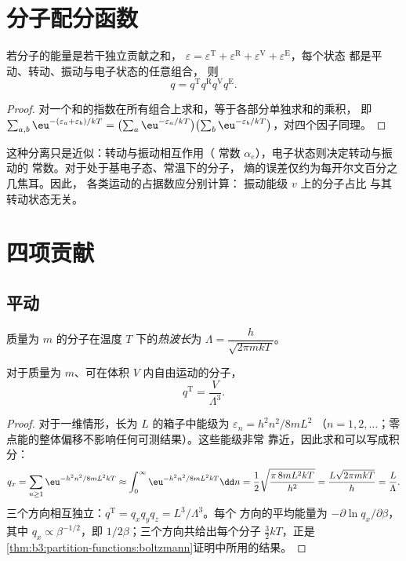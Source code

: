 \section{分子配分函数}

\begin{proposition}[因子分解]\label{prop:b3:partition-functions:factorisation}
若分子的能量是若干独立贡献之和，
$\varepsilon = \varepsilon^{\mathrm T} + \varepsilon^{\mathrm R} + \varepsilon^{\mathrm V} + \varepsilon^{\mathrm E}$，每个状态
都是平动、转动、振动与电子状态的任意组合，
则
\[
  q = q^{\mathrm T}q^{\mathrm R}q^{\mathrm V}q^{\mathrm E}.
\]
\end{proposition}

\begin{proof}
对一个和的指数在所有组合上求和，等于各部分单独求和的乘积，
即 $\sum_{a,b}\eu^{-(\varepsilon_a+\varepsilon_b)/kT} = \bigl(\sum_a\eu^{-\varepsilon_a/kT}\bigr)
\bigl(\sum_b\eu^{-\varepsilon_b/kT}\bigr)$，对四个因子同理。
\end{proof}

这种分离只是近似：转动与振动相互作用（
常数 $\alpha_e$），电子状态则决定转动与振动的
常数。对于处于基电子态、常温下的分子，
熵的误差仅约为每开尔文百分之几焦耳。因此，
各类运动的占据数应分别计算：
振动能级 $v$ 上的分子占比
与其转动状态无关。

\section{四项贡献}

\subsection*{平动}

\begin{definition}[热波长]\label{def:b3:partition-functions:thermal-wavelength}
质量为 $m$ 的分子在温度 $T$ 下的\emph{热波长}为
$\Lambda = \dfrac{h}{\sqrt{2\pi mkT}}$。
\end{definition}

\begin{proposition}[平动配分函数]\label{prop:b3:partition-functions:q-trans}
对于质量为 $m$、可在体积 $V$ 内自由运动的分子，
\[
  q^{\mathrm T} = \frac{V}{\Lambda^3}.
\]
\end{proposition}

\begin{proof}
对于一维情形，长为 $L$ 的箱子中能级为 $\varepsilon_n = h^2n^2/8mL^2$
（$n = 1, 2, \dots$；零点能的整体偏移不影响任何可测结果）。这些能级非常
靠近，因此求和可以写成积分：
\[
  q_x = \sum_{n\ge1}\eu^{-h^2n^2/8mL^2kT} \approx \int_0^\infty\eu^{-h^2n^2/8mL^2kT}\dd n
      = \frac12\sqrt{\frac{\pi\,8mL^2kT}{h^2}} = \frac{L\sqrt{2\pi mkT}}{h} = \frac{L}{\Lambda}.
\]
三个方向相互独立：$q^{\mathrm T} = q_xq_yq_z = L^3/\Lambda^3$。每个
方向的平均能量为 $-\partial\ln q_x/\partial\beta$，其中 $q_x \propto \beta^{-1/2}$，即
$1/2\beta$；三个方向共给出每个分子 $\frac32kT$，正是
\cref{thm:b3:partition-functions:boltzmann}证明中所用的结果。
\end{proof}

